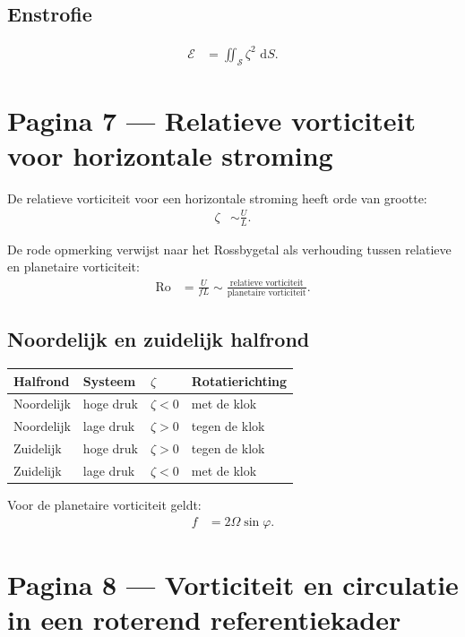 \documentclass[11pt]{article}
\newcommand{\dd}{\,\mathrm{d}}
\begin{document}
\subsection*{Enstrofie}

\begin{align*}
\mathcal{E}
  &=
  \iint_{\mathcal{S}}\zeta^2\,\dd S.
\end{align*}

\section*{Pagina 7 --- Relatieve vorticiteit voor horizontale stroming}

De relatieve vorticiteit voor een horizontale stroming heeft orde van grootte:
\begin{align*}
\zeta
  &\sim \frac{U}{L}.
\end{align*}

De rode opmerking verwijst naar het Rossbygetal als verhouding tussen relatieve en planetaire vorticiteit:
\begin{align*}
\mathrm{Ro}
  &=
  \frac{U}{fL}
  \sim
  \frac{\text{relatieve vorticiteit}}
       {\text{planetaire vorticiteit}}.
\end{align*}

\subsection*{Noordelijk en zuidelijk halfrond}

\begin{center}
\begin{tabular}{llll}
\toprule
Halfrond & Systeem & $\zeta$ & Rotatierichting \\
\midrule
Noordelijk & hoge druk & $\zeta<0$ & met de klok \\
Noordelijk & lage druk  & $\zeta>0$ & tegen de klok \\
Zuidelijk  & hoge druk & $\zeta>0$ & tegen de klok \\
Zuidelijk  & lage druk  & $\zeta<0$ & met de klok \\
\bottomrule
\end{tabular}
\end{center}

Voor de planetaire vorticiteit geldt:
\begin{align*}
f
  &=
  2\Omega\sin\varphi.
\end{align*}

\section*{Pagina 8 --- Vorticiteit en circulatie in een roterend referentiekader}
\end{document}

